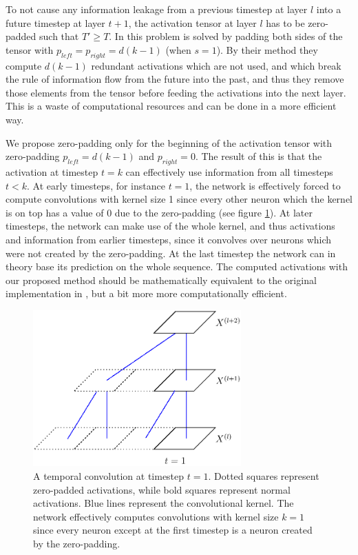 \documentclass[a4paper, twoside]{article}
\begin{document}
To not cause any information leakage from a previous timestep at layer $l$ into a future timestep at layer $t+1$, the activation tensor at layer $l$ has to be zero-padded such that $T' \geq T$. In \cite{tcn} this problem is solved by padding both sides of the tensor with $p_{left} = p_{right} = d(k-1)$ (when $s=1$). By their method they compute $d(k-1)$ redundant activations which are not used, and which break the rule of information flow from the future into the past, and thus they remove those elements from the tensor before feeding the activations into the next layer. This is a waste of computational resources and can be done in a more efficient way.

We propose zero-padding only for the beginning of the activation tensor with zero-padding $p_{left} = d(k-1)$ and $p_{right} = 0$. The result of this is that the activation at timestep $t=k$ can effectively use information from all timesteps $t<k$. At early timesteps, for instance $t=1$, the network is effectively forced to compute convolutions with kernel size 1 since every other neuron which the kernel is on top has a value of 0 due to the zero-padding (see figure \ref{figTCNZeropad}). At later timesteps, the network can make use of the whole kernel, and thus activations and information from earlier timesteps, since it convolves over neurons which were not created by the zero-padding. At the last timestep the network can in theory base its prediction on the whole sequence. The computed activations with our proposed method should be mathematically equivalent to the original implementation in \cite{tcn}, but a bit more more computationally efficient.

\begin{figure}[h]
\begin{center}
    \includegraphics[width=8cm]{figTCNZeropad.eps}\caption{A temporal convolution at timestep $t=1$. Dotted squares represent zero-padded activations, while bold squares represent normal activations. Blue lines represent the convolutional kernel. The network effectively computes convolutions with kernel size $k=1$ since every neuron except at the first timestep is a neuron created by the zero-padding.}\label{figTCNZeropad}
\end{center}
\end{figure}
\end{document}
